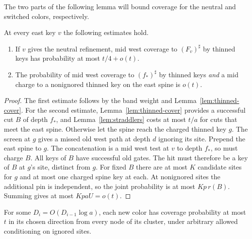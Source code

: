 The two parts of the following lemma will bound coverage for the
neutral and switched colors, respectively.

\begin{lemma}\label{lem:two-spine-estimates}
At every east key \(v\) the following estimates hold.
\begin{enumerate}
\item\label{item:small-band}
If \(v\) gives the neutral refinement, mid west coverage to
\((F_v)^\sharp\) by thinned keys has probability at most \(t/4+o(t)\).
\item\label{item:rare-joint-hit}
The probability of mid west coverage to \((f_*)^\sharp\) by thinned
keys \emph{and} a mid charge to a nonignored thinned key on the east
spine is \(o(t)\).
\end{enumerate}
\end{lemma}

\begin{proof}
The first estimate follows by the band weight and Lemma~\ref{lem:thinned-cover}.
For the second estimate, Lemma~\ref{lem:thinned-cover} provides a
successful cut \(B\) of depth \(f_*\), and Lemma~\ref{lem:straddlers}
costs at most \(t/a\) for cuts that meet the east spine. Otherwise
let the spine reach the charged thinned key \(g\). The screen at
\(g\) gives a missed old west path at depth \(d\) ignoring its site.
Prepend the east spine to \(g\). The concatenation is a mid west test
at \(v\) to depth \(f_*\), so must charge \(B\). All keys of \(B\) have
successful old gates. The hit must therefore be a key of \(B\) at
\(g\)'s site, distinct from \(g\). For fixed \(B\) there are at most
\(K\) candidate sites for \(g\) and at most one charged spine key at
each. At nonignored sites the additional pin is independent, so the
joint probability is at most \(Kp\,r(B)\). Summing gives at most
\(KpaU=o(t)\).
\end{proof}

\begin{proposition}\label{prop:directional-cap}
For some \(D_i=O(D_{i-1}\log a)\), each new color has coverage
probability at most \(t\) in its chosen direction from every node
of its cluster, under arbitrary allowed conditioning on ignored sites.
\end{proposition}

